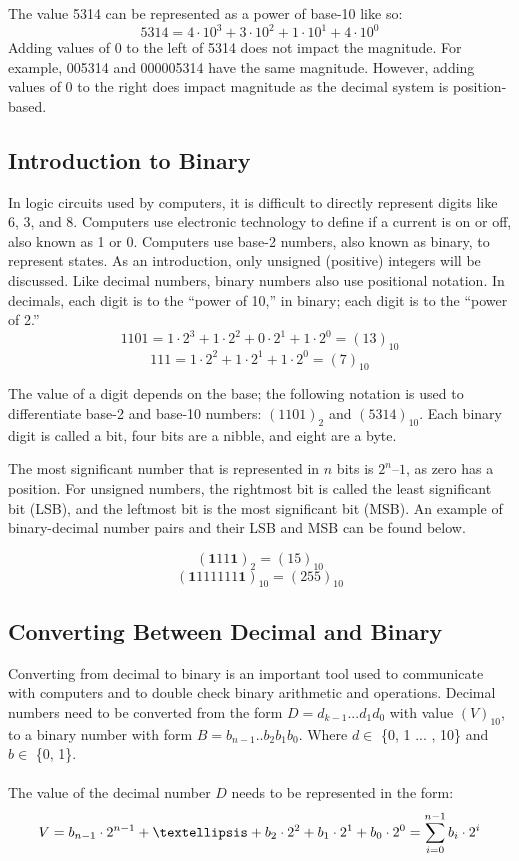 \documentclass[twocolumn, 10pt]{article}
\begin{document}
The value 5314 can be represented as a power of base-10 like so: 
$$ 5314 = 4 \cdot 10^3 + 3 \cdot 10^2 + 1 \cdot 10^1 + 4 \cdot 10^0$$ 
Adding values of 0 to the left of 5314 does not impact the magnitude. For example, 005314 and 000005314 have the same magnitude. However, adding values of 0 to the right does impact magnitude as the decimal system is position-based. 

\subsection{Introduction to Binary}
In logic circuits used by computers, it is difficult to directly represent digits like 6, 3, and 8. Computers use electronic technology to define if a current is on or off, also known as 1 or 0. Computers use base-2 numbers, also known as binary, to represent states. As an introduction, only unsigned (positive) integers will be discussed. Like decimal numbers, binary numbers also use positional notation. In decimals, each digit is to the “power of 10,” in binary; each digit is to the “power of 2.”  
$$1101 = 1 \cdot 2^3 + 1 \cdot 2^2 + 0 \cdot 2^ 1 + 1 \cdot 2^0 = (13)_{10}$$
$$ 111 = 1 \cdot 2^2 + 1 \cdot 2^1 + 1 \cdot 2^0 = (7)_{10}$$



The value of a digit depends on the base; the following notation is used to differentiate base-2 and base-10 numbers: $(1101)_{2}$ and $(5314)_{10}$. Each binary digit is called a bit, four bits are a nibble, and eight are a byte.

The most significant number that is represented in $n$ bits is $2^n – 1$, as zero has a position. For unsigned numbers, the rightmost bit is called the least significant bit (LSB), and the leftmost bit is the most significant bit (MSB). An example of binary-decimal number pairs and their LSB and MSB can be found below.

$$(\textbf{1}11\textbf{1})_{2} = (15)_{10}$$
$$(\textbf{1}111 111\textbf{1})_{10} = (255)_{10}$$

\subsection{Converting Between Decimal and Binary}
Converting from decimal to binary is an important tool used to communicate with computers and to double check binary arithmetic and operations. Decimal numbers need to be converted from the form $D = d_{k-1} ... d_{1}d_{0}$ with value $(V)_{10}$, to a binary number with form $B = b_{n-1} .. b_{2}b_{1}b_{0}$. Where $d \in $ \{0, 1 ... , 10\} and $b \in$ \{0, 1\}. 
\\ \\
The value of the decimal number $D$ needs to be represented in the form: 
\begin{equation}
V = b_{n-1} \cdot 2^{n-1} + … + b_{2} \cdot 2^2 + b_{1} \cdot 2^1 + b_{0} \cdot 2^0 \\ = \sum_{i=0}^{n-1} b_{i} \cdot 2^i
\end{equation}
\end{document}
